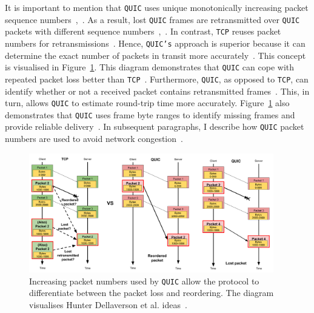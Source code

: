 \documentclass[12pt,a4paper,twoside,openright]{report}
\begin{document}
\begin{itemize}
    
    
    
    It is important to mention that \texttt{QUIC} uses unique monotonically increasing packet sequence numbers~\cite{UnderstandQUIC, The_QUIC_Transport_Protocol_Design_and_Internet-Scale_Deployment},~\cite[Section~4.2]{ietf-quic-recovery-32}.
    As a result, lost \texttt{QUIC} frames are retransmitted over \texttt{QUIC} packets with different sequence numbers~\cite[Section~4]{ietf-quic-recovery-32},~\cite{UnderstandQUIC}.
    In contrast, \texttt{TCP} reuses packet numbers for retransmissions~\cite[Section~4]{ietf-quic-recovery-32}.
    Hence, \texttt{QUIC's} approach is superior because it can determine the exact number of packets in transit more accurately~\cite{UnderstandQUIC}.
    This concept is visualised in Figure~\ref{fig:Impact_of_increasing_pkt_numbers}.
    This diagram demonstrates that \texttt{QUIC} can cope with repeated packet loss better than \texttt{TCP}~\cite{UnderstandQUIC}.
    Furthermore, \texttt{QUIC}, as opposed to \texttt{TCP}, can identify whether or not a received packet contains retransmitted frames~\cite{UnderstandQUIC}.
    This, in turn, allows \texttt{QUIC} to estimate round-trip time more accurately.
    Figure~\ref{fig:Impact_of_increasing_pkt_numbers} also demonstrates that \texttt{QUIC} uses frame byte ranges to identify missing frames and provide reliable delivery~\cite{UnderstandQUIC}.
    In subsequent paragraphs, I describe how \texttt{QUIC} packet numbers are used to avoid network congestion~\cite{UnderstandQUIC}.
    
    \begin{figure}[H]
    \centering
    \includegraphics[width=0.95\textwidth]{figs/Impact_of_increasing_pkt_numbers.png}
    \caption[Increasing packet numbers used by \texttt{QUIC} allow the protocol to differentiate between the packet loss and reordering]{Increasing packet numbers used by \texttt{QUIC} allow the protocol to differentiate between the packet loss and reordering. The diagram visualises Hunter Dellaverson et al. ideas~\cite{UnderstandQUIC}.}
    \label{fig:Impact_of_increasing_pkt_numbers}
    \end{figure}
    

\end{itemize}
\end{document}
